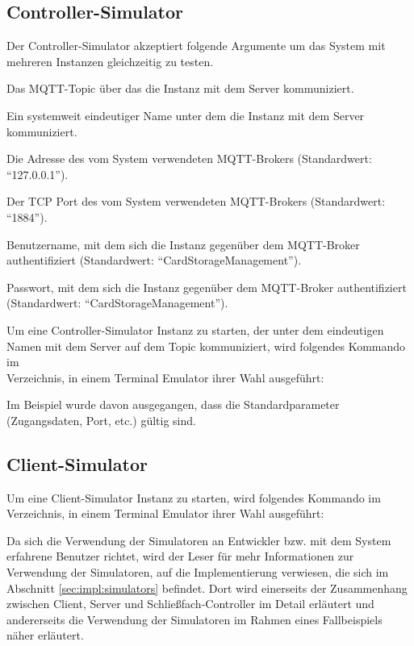 \newpage
\subsection{Controller-Simulator}
Der Controller-Simulator akzeptiert folgende Argumente um das System mit mehreren Instanzen gleichzeitig zu testen.
\begin{description}\setlength\itemsep{1.25em}
\item[\mono{-{}-topic}] Das MQTT-Topic über das die Instanz mit dem Server kommuniziert.
\item[\mono{-{}-client-id}] Ein systemweit eindeutiger Name unter dem die Instanz mit dem Server kommuniziert.
\item[\mono{-{}-broker-url}] Die Adresse des vom System verwendeten MQTT-Brokers (Standardwert: ``127.0.0.1'').
\item[\mono{-{}-broker-port}] Der TCP Port des vom System verwendeten MQTT-Brokers (Standardwert: ``1884'').
\item[\mono{-{}-broker-username}] Benutzername, mit dem sich die Instanz gegenüber dem MQTT-Broker authentifiziert (Standardwert: ``CardStorageManagement''). 
\item[\mono{-{}-broker-passwd}] Passwort, mit dem sich die Instanz gegenüber dem MQTT-Broker authentifiziert (Standardwert: ``CardStorageManagement'').
\end{description}\medskip

\noindent
Um eine Controller-Simulator Instanz zu starten, der unter dem eindeutigen Namen  mit dem Server auf dem Topic  kommuniziert, wird folgendes Kommando im\\  Verzeichnis, in einem Terminal Emulator ihrer Wahl ausgeführt:\bigskip

\noindent
{}\bigskip

\noindent
Im Beispiel wurde davon ausgegangen, dass die Standardparameter (Zugangsdaten, Port, etc.) gültig sind.
\newpage
\subsection{Client-Simulator}
Um eine Client-Simulator Instanz zu starten, wird folgendes Kommando im\\  Verzeichnis, in einem Terminal Emulator ihrer Wahl ausgeführt:\bigskip

\noindent
{}\bigskip

\noindent
Da sich die Verwendung der Simulatoren an Entwickler bzw. mit dem System erfahrene Benutzer richtet, wird der Leser für mehr Informationen zur Verwendung der Simulatoren, auf die Implementierung verwiesen, die sich im Abschnitt \ref{sec:impl:simulators} befindet. Dort wird einerseits der Zusammenhang zwischen Client, Server und Schließfach-Controller im Detail erläutert und andererseits die Verwendung der Simulatoren im Rahmen eines Fallbeispiels näher erläutert.    